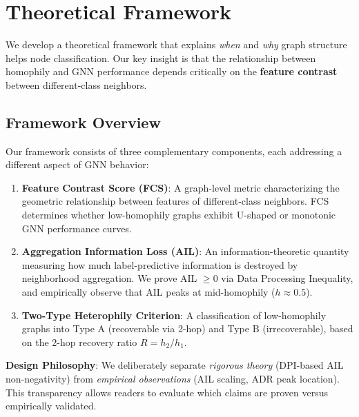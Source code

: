 
\section{Theoretical Framework}
\label{sec:theory}

We develop a theoretical framework that explains \textit{when} and \textit{why} graph structure helps node classification. Our key insight is that the relationship between homophily and GNN performance depends critically on the \textbf{feature contrast} between different-class neighbors.

\subsection{Framework Overview}

Our framework consists of three complementary components, each addressing a different aspect of GNN behavior:

\begin{enumerate}
    \item \textbf{Feature Contrast Score (FCS)}: A graph-level metric characterizing the geometric relationship between features of different-class neighbors. FCS determines whether low-homophily graphs exhibit U-shaped or monotonic GNN performance curves.

    \item \textbf{Aggregation Information Loss (AIL)}: An information-theoretic quantity measuring how much label-predictive information is destroyed by neighborhood aggregation. We prove AIL $\geq 0$ via Data Processing Inequality, and empirically observe that AIL peaks at mid-homophily ($h \approx 0.5$).

    \item \textbf{Two-Type Heterophily Criterion}: A classification of low-homophily graphs into Type A (recoverable via 2-hop) and Type B (irrecoverable), based on the 2-hop recovery ratio $R = h_2/h_1$.
\end{enumerate}

\textbf{Design Philosophy}: We deliberately separate \textit{rigorous theory} (DPI-based AIL non-negativity) from \textit{empirical observations} (AIL scaling, ADR peak location). This transparency allows readers to evaluate which claims are proven versus empirically validated.

